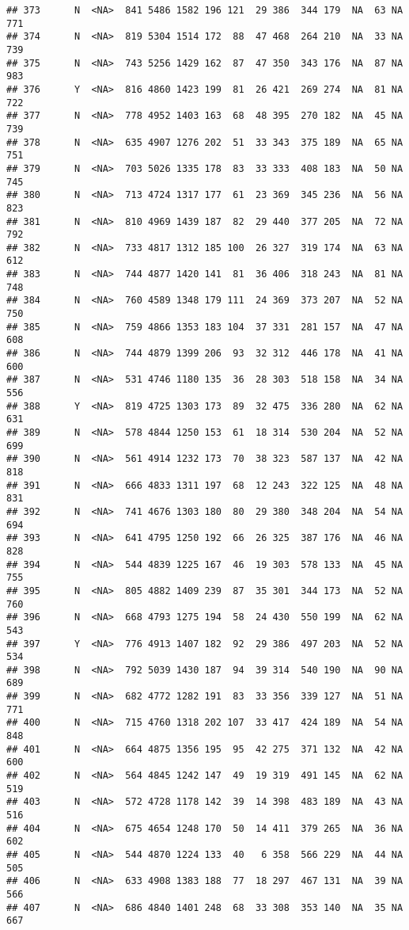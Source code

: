 \documentclass[]{article}
\begin{document}
\begin{verbatim}
## 373      N  <NA>  841 5486 1582 196 121  29 386  344 179  NA  63 NA  771
## 374      N  <NA>  819 5304 1514 172  88  47 468  264 210  NA  33 NA  739
## 375      N  <NA>  743 5256 1429 162  87  47 350  343 176  NA  87 NA  983
## 376      Y  <NA>  816 4860 1423 199  81  26 421  269 274  NA  81 NA  722
## 377      N  <NA>  778 4952 1403 163  68  48 395  270 182  NA  45 NA  739
## 378      N  <NA>  635 4907 1276 202  51  33 343  375 189  NA  65 NA  751
## 379      N  <NA>  703 5026 1335 178  83  33 333  408 183  NA  50 NA  745
## 380      N  <NA>  713 4724 1317 177  61  23 369  345 236  NA  56 NA  823
## 381      N  <NA>  810 4969 1439 187  82  29 440  377 205  NA  72 NA  792
## 382      N  <NA>  733 4817 1312 185 100  26 327  319 174  NA  63 NA  612
## 383      N  <NA>  744 4877 1420 141  81  36 406  318 243  NA  81 NA  748
## 384      N  <NA>  760 4589 1348 179 111  24 369  373 207  NA  52 NA  750
## 385      N  <NA>  759 4866 1353 183 104  37 331  281 157  NA  47 NA  608
## 386      N  <NA>  744 4879 1399 206  93  32 312  446 178  NA  41 NA  600
## 387      N  <NA>  531 4746 1180 135  36  28 303  518 158  NA  34 NA  556
## 388      Y  <NA>  819 4725 1303 173  89  32 475  336 280  NA  62 NA  631
## 389      N  <NA>  578 4844 1250 153  61  18 314  530 204  NA  52 NA  699
## 390      N  <NA>  561 4914 1232 173  70  38 323  587 137  NA  42 NA  818
## 391      N  <NA>  666 4833 1311 197  68  12 243  322 125  NA  48 NA  831
## 392      N  <NA>  741 4676 1303 180  80  29 380  348 204  NA  54 NA  694
## 393      N  <NA>  641 4795 1250 192  66  26 325  387 176  NA  46 NA  828
## 394      N  <NA>  544 4839 1225 167  46  19 303  578 133  NA  45 NA  755
## 395      N  <NA>  805 4882 1409 239  87  35 301  344 173  NA  52 NA  760
## 396      N  <NA>  668 4793 1275 194  58  24 430  550 199  NA  62 NA  543
## 397      Y  <NA>  776 4913 1407 182  92  29 386  497 203  NA  52 NA  534
## 398      N  <NA>  792 5039 1430 187  94  39 314  540 190  NA  90 NA  689
## 399      N  <NA>  682 4772 1282 191  83  33 356  339 127  NA  51 NA  771
## 400      N  <NA>  715 4760 1318 202 107  33 417  424 189  NA  54 NA  848
## 401      N  <NA>  664 4875 1356 195  95  42 275  371 132  NA  42 NA  600
## 402      N  <NA>  564 4845 1242 147  49  19 319  491 145  NA  62 NA  519
## 403      N  <NA>  572 4728 1178 142  39  14 398  483 189  NA  43 NA  516
## 404      N  <NA>  675 4654 1248 170  50  14 411  379 265  NA  36 NA  602
## 405      N  <NA>  544 4870 1224 133  40   6 358  566 229  NA  44 NA  505
## 406      N  <NA>  633 4908 1383 188  77  18 297  467 131  NA  39 NA  566
## 407      N  <NA>  686 4840 1401 248  68  33 308  353 140  NA  35 NA  667

\end{verbatim}
\end{document}
